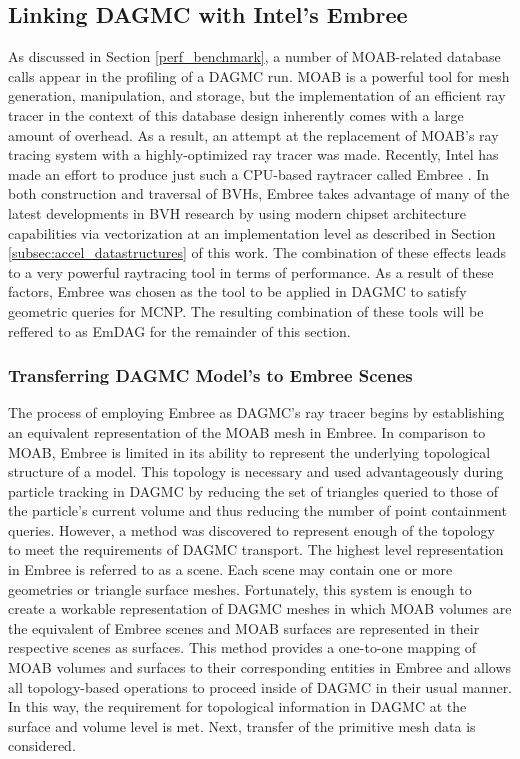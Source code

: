 \documentclass[12pt, a4paper]{article}
\begin{document}
\subsection{Linking DAGMC with Intel's Embree}%
\label{emdag}

As discussed in Section \ref{perf_benchmark}, a number of MOAB-related database calls appear in the profiling of a DAGMC run. MOAB is a powerful tool for mesh generation, manipulation, and storage, but the implementation of an efficient ray tracer in the context of this database design inherently comes with a large amount of overhead. As a result, an attempt at the replacement of MOAB's ray tracing system with a highly-optimized ray tracer was made. Recently, Intel has made an effort to produce just such a CPU-based raytracer called Embree \cite{Wald_2014}. In both construction and traversal of BVHs, Embree takes advantage of many of the latest developments in BVH research by using modern chipset architecture capabilities via vectorization at an implementation level as described in Section \ref{subsec:accel_datastructures} of this work. The combination of these effects leads to a very powerful raytracing tool in terms of performance. As a result of these factors, Embree was chosen as the tool to be applied in DAGMC to satisfy geometric queries for MCNP. The resulting combination of these tools will be reffered to as EmDAG for the remainder of this section.

\subsubsection{Transferring DAGMC Model's to Embree Scenes}%

The process of employing Embree as DAGMC's ray tracer begins by establishing an equivalent representation of the MOAB mesh in Embree. In comparison to MOAB, Embree is limited in its ability to represent the underlying topological structure of a model. This topology is necessary and used advantageously during particle tracking in DAGMC by reducing the set of triangles queried to those of the particle's current volume and thus reducing the number of point containment queries. However, a method was discovered to represent enough of the topology to meet the requirements of DAGMC transport. The highest level representation in Embree is referred to as a scene. Each scene may contain one or more geometries or triangle surface meshes. Fortunately, this system is enough to create a workable representation of DAGMC meshes in which MOAB volumes are the equivalent of Embree scenes and MOAB surfaces are represented in their respective scenes as surfaces. This method provides a one-to-one mapping of MOAB volumes and surfaces to their corresponding entities in Embree and allows all topology-based operations to proceed inside of DAGMC in their usual manner. In this way, the requirement for topological information in DAGMC at the surface and volume level is met. Next, transfer of the primitive mesh data is considered.
\end{document}
